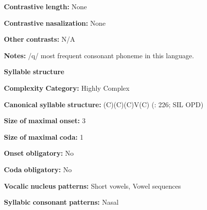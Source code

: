 \documentclass[output=paper]{langsci/langscibook}
\begin{document}
\begin{styleBody}
\textbf{Contrastive} \textbf{length:} None
\end{styleBody}

\begin{styleBody}
\textbf{Contrastive} \textbf{nasalization:} None
\end{styleBody}

\begin{styleBody}
\textbf{Other} \textbf{contrasts:} N/A
\end{styleBody}

\begin{styleBody}
\textbf{Notes:} /q/ most frequent consonant phoneme in this language.
\end{styleBody}

\begin{styleBody}
\textbf{Syllable} \textbf{structure}
\end{styleBody}

\begin{styleBody}
\textbf{Complexity} \textbf{Category:} Highly Complex
\end{styleBody}

\begin{styleBody}
\textbf{Canonical} \textbf{syllable} \textbf{structure:} (C)(C)(C)V(C) (\citealt{Whitehead2004}: 226; SIL OPD)
\end{styleBody}

\begin{styleBody}
\textbf{Size} \textbf{of} \textbf{maximal} \textbf{onset:} 3
\end{styleBody}

\begin{styleBody}
\textbf{Size} \textbf{of} \textbf{maximal} \textbf{coda:} 1
\end{styleBody}

\begin{styleBody}
\textbf{Onset} \textbf{obligatory:} No
\end{styleBody}

\begin{styleBody}
\textbf{Coda} \textbf{obligatory:} No
\end{styleBody}

\begin{styleBody}
\textbf{Vocalic} \textbf{nucleus} \textbf{patterns:} Short vowels, Vowel sequences
\end{styleBody}

\begin{styleBody}
\textbf{Syllabic} \textbf{consonant} \textbf{patterns:} Nasal
\end{styleBody}
\end{document}
